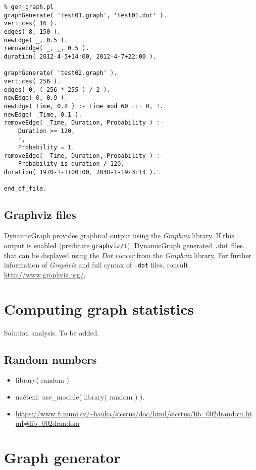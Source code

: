 \documentclass[11pt, a4paper,draft]{article}
\newcommand{\pl}[1]{\texttt{#1}} %
\theoremstyle{plain}
\theoremstyle{definition}
\theoremstyle{remark}
\newcommand{\gv}{\textit{Graphviz}}
\begin{document}
\begin{verbatim}
% gen_graph.pl
graphGenerate( 'test01.graph', 'test01.dot' ).
vertices( 16 ).
edges( 8, 150 ).
newEdge( _, 0.5 ).
removeEdge( _, _, 0.5 ).
duration( 2012-4-5+14:00, 2012-4-7+22:00 ).

graphGenerate( 'test02.graph' ).
vertices( 256 ).
edges( 0, ( 256 * 255 ) / 2 ).
newEdge( 0, 0.9 ).
newEdge( Time, 0.8 ) :- Time mod 60 =:= 0, !.
newEdge( _Time, 0.1 ).
removeEdge( _Time, Duration, Probability ) :-
    Duration >= 120,
    !,
    Probability = 1.
removeEdge( _Time, Duration, Probability ) :-
    Probability is duration / 120.
duration( 1970-1-1+00:00, 2038-1-19+3:14 ).

end_of_file.
\end{verbatim}

\subsection{Graphviz files}
\label{sec:files-graphviz}

DynamicGraph provides graphical output using the \gv{} library. 
If this output is enabled (predicate \pl{graphviz/1}), DynamicGraph generated \pl{.dot} files, 
that can be displayed using the \textit{Dot viewer} from the \gv{} library. 
For further information of \gv{} and full syntax of \pl{.dot} files, consult \url{http://www.graphviz.org/}.

\section{Computing graph statistics}
\label{sec:computing}

Solution analysis. To be added.

\subsection{Random numbers}
\label{sec:computing-random}
\begin{itemize}
    \item library( random )
    \item načtení: use\_module( library( random ) ).
    \item \url{https://www.fi.muni.cz/~hanka/sicstus/doc/html/sicstus/lib_002drandom.html#lib_002drandom}
\end{itemize}

\section{Graph generator}
\label{sec:generator}
\end{document}

